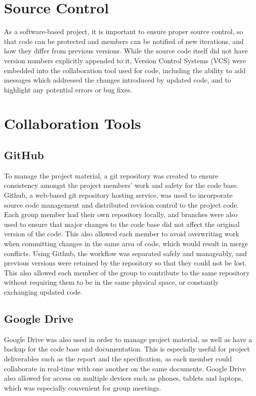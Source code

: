 \section{Source Control}
As a software-based project, it is important to ensure proper source control, so that code can be protected and members can be notified of new iterations, and how they differ from previous versions. While the source code itself did not have version numbers explicitly appended to it, Version Control Systems (VCS) were embedded into the collaboration tool used for code, including the ability to add messages which addressed the changes introduced by updated code, and to highlight any potential errors or bug fixes.

\section{Collaboration Tools}
\label{colab}

\subsection{GitHub}
To manage the project material, a git repository was created to ensure consistency amongst the project members' work and safety for the code base. Github, a web-based git repository hosting service, was used to incorporate source code management and distributed revision control to the project code. Each group member had their own repository locally, and branches were also used to ensure that major changes to the code base did not affect the original version of the code. This also allowed each member to avoid overwriting work when committing changes in the same area of code, which would result in merge conflicts. Using Github, the workflow was separated safely and manageably, and previous versions were retained by the repository so that they could not be lost. This also allowed each member of the group to contribute to the same repository without requiring them to be in the same physical space, or constantly exchanging updated code.

\subsection{Google Drive}
Google Drive was also used in order to manage project material, as well as have a backup for the code base and documentation. This is especially useful for project deliverables such as the report and the specification, as each member could collaborate in real-time with one another on the same documents. Google Drive also allowed for access on multiple devices such as phones, tablets and laptops, which was especially convenient for group meetings.


